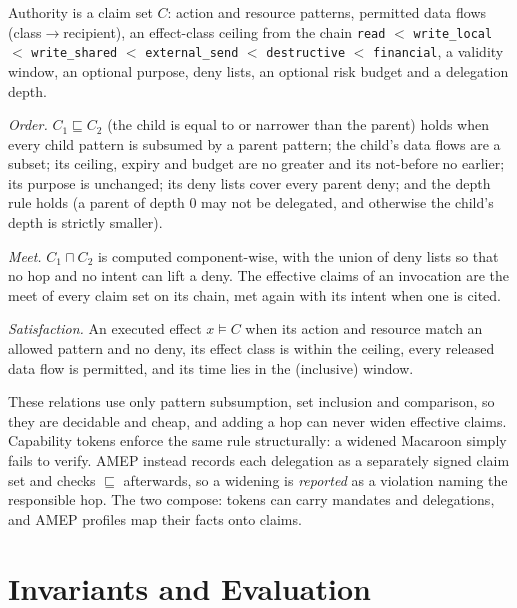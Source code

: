 \documentclass[conference]{IEEEtran}
\newcommand{\code}[1]{\texttt{\small #1}}
\begin{document}
Authority is a claim set $C$: action and resource patterns, permitted data flows (class$\to$recipient), an effect-class ceiling from the chain \code{read} $<$ \code{write\_local} $<$ \code{write\_shared} $<$ \code{external\_send} $<$ \code{destructive} $<$ \code{financial}, a validity window, an optional purpose, deny lists, an optional risk budget and a delegation depth.

\emph{Order.} $C_1 \sqsubseteq C_2$ (the child is equal to or narrower than the parent) holds when every child pattern is subsumed by a parent pattern; the child's data flows are a subset; its ceiling, expiry and budget are no greater and its not-before no earlier; its purpose is unchanged; its deny lists cover every parent deny; and the depth rule holds (a parent of depth 0 may not be delegated, and otherwise the child's depth is strictly smaller).

\emph{Meet.} $C_1 \sqcap C_2$ is computed component-wise, with the union of deny lists so that no hop and no intent can lift a deny. The effective claims of an invocation are the meet of every claim set on its chain, met again with its intent when one is cited.

\emph{Satisfaction.} An executed effect $x \models C$ when its action and resource match an allowed pattern and no deny, its effect class is within the ceiling, every released data flow is permitted, and its time lies in the (inclusive) window.

These relations use only pattern subsumption, set inclusion and comparison, so they are decidable and cheap, and adding a hop can never widen effective claims. Capability tokens enforce the same rule structurally: a widened Macaroon simply fails to verify. AMEP instead records each delegation as a separately signed claim set and checks $\sqsubseteq$ afterwards, so a widening is \emph{reported} as a violation naming the responsible hop. The two compose: tokens can carry mandates and delegations, and AMEP profiles map their facts onto claims.

\section{Invariants and Evaluation}\label{sec:eval}
\end{document}
